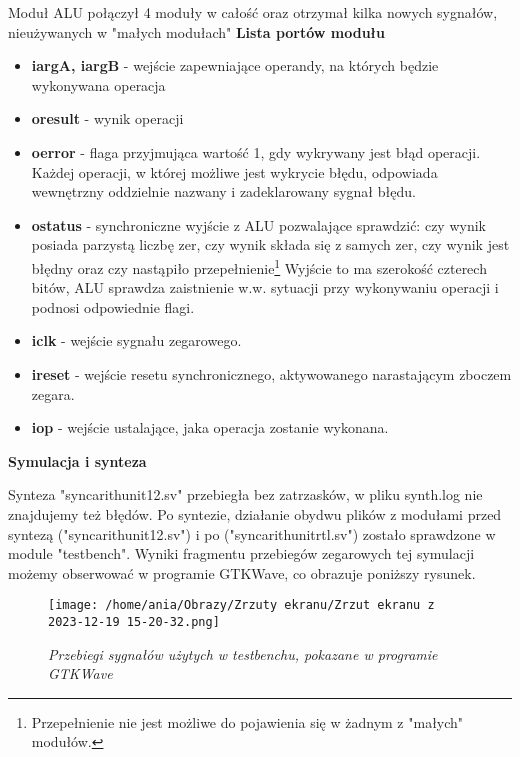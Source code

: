 \documentclass[12pt]{article}
\begin{document}
Moduł ALU połączył 4 moduły w całość oraz otrzymał kilka nowych sygnałów, nieużywanych w "małych modułach"
\textbf{Lista portów modułu}
\begin{itemize}
  \item \textbf{i\textunderscore arg\textunderscore A, i\textunderscore arg\textunderscore B} - wejście zapewniające 
  operandy, na których będzie wykonywana operacja
  \item \textbf{o\textunderscore result} - wynik operacji
  \item \textbf{o\textunderscore error} - flaga przyjmująca wartość 1, gdy wykrywany jest błąd operacji. Każdej operacji, w której możliwe
  jest wykrycie błędu, odpowiada wewnętrzny oddzielnie nazwany i zadeklarowany sygnał błędu.
  \item \textbf{o\textunderscore status} - synchroniczne wyjście z ALU pozwalające sprawdzić: czy wynik posiada parzystą liczbę zer, 
  czy wynik składa się z samych zer, czy wynik jest błędny oraz czy nastąpiło przepełnienie\footnote[3]{Przepełnienie nie jest możliwe do pojawienia się
  w żadnym z "małych" modułów.} Wyjście to ma szerokość czterech bitów, ALU sprawdza zaistnienie w.w. sytuacji przy wykonywaniu operacji i podnosi odpowiednie
  flagi.
  \item \textbf{i\textunderscore clk} - wejście sygnału zegarowego.
  \item \textbf{i\textunderscore reset} - wejście resetu synchronicznego, aktywowanego narastającym zboczem zegara.
  \item \textbf{i\textunderscore op} - wejście ustalające, jaka operacja zostanie wykonana.
\end{itemize}

\textbf{Symulacja i synteza}

Synteza "sync\textunderscore arith\textunderscore unit\textunderscore 12.sv" przebiegła bez zatrzasków, w pliku synth.log nie znajdujemy też błędów. Po syntezie, działanie
obydwu plików z modułami przed syntezą ("sync\textunderscore arith\textunderscore unit\textunderscore 12.sv") i po ("sync\textunderscore arith\textunderscore unit\textunderscore rtl.sv") 
zostało sprawdzone w module "testbench".
Wyniki fragmentu przebiegów zegarowych tej symulacji możemy obserwować w programie GTKWave, co obrazuje poniższy rysunek.

\begin{figure}[h]
  \centering
  \texttt{[image: /home/ania/Obrazy/Zrzuty ekranu/Zrzut ekranu z 2023-12-19 15-20-32.png]}
  \centering
  \caption{\textit{Przebiegi sygnałów użytych w testbenchu, pokazane w programie GTKWave}}
  \end{figure}
\end{document}
